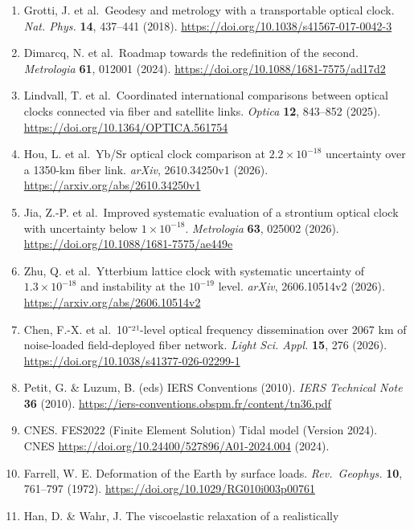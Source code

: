 \documentclass[
  10pt,
  a4paper,
]{article}
\begin{document}
\begin{enumerate}
  McGrew, W. F. et al.~Atomic clock performance enabling geodesy below
  the centimetre level. \emph{Nature} \textbf{564}, 87--90 (2018).
  \url{https://doi.org/10.1038/s41586-018-0738-2}
\item
  Grotti, J. et al.~Geodesy and metrology with a transportable optical
  clock. \emph{Nat. Phys.} \textbf{14}, 437--441 (2018).
  \url{https://doi.org/10.1038/s41567-017-0042-3}
\item
  Dimarcq, N. et al.~Roadmap towards the redefinition of the second.
  \emph{Metrologia} \textbf{61}, 012001 (2024).
  \url{https://doi.org/10.1088/1681-7575/ad17d2}
\item
  Lindvall, T. et al.~Coordinated international comparisons between
  optical clocks connected via fiber and satellite links. \emph{Optica}
  \textbf{12}, 843--852 (2025).
  \url{https://doi.org/10.1364/OPTICA.561754}
\item
  Hou, L. et al.~Yb/Sr optical clock comparison at \(2.2\times10^{-18}\)
  uncertainty over a 1350-km fiber link. \emph{arXiv}, 2610.34250v1
  (2026). \url{https://arxiv.org/abs/2610.34250v1}
\item
  Jia, Z.-P. et al.~Improved systematic evaluation of a strontium
  optical clock with uncertainty below \(1\times10^{-18}\).
  \emph{Metrologia} \textbf{63}, 025002 (2026).
  \url{https://doi.org/10.1088/1681-7575/ae449e}
\item
  Zhu, Q. et al.~Ytterbium lattice clock with systematic uncertainty of
  \(1.3\times 10^{-18}\) and instability at the \(10^{-19}\) level.
  \emph{arXiv}, 2606.10514v2 (2026).
  \url{https://arxiv.org/abs/2606.10514v2}
\item
  Chen, F.-X. et al.~10⁻²¹-level optical frequency dissemination over
  2067 km of noise-loaded field-deployed fiber network. \emph{Light Sci.
  Appl.} \textbf{15}, 276 (2026).
  \url{https://doi.org/10.1038/s41377-026-02299-1}
\item
  Petit, G. \& Luzum, B. (eds) IERS Conventions (2010). \emph{IERS
  Technical Note} \textbf{36} (2010).
  \url{https://iers-conventions.obspm.fr/content/tn36.pdf}
\item
  CNES. FES2022 (Finite Element Solution) Tidal model (Version 2024).
  CNES \url{https://doi.org/10.24400/527896/A01-2024.004} (2024).
\item
  Farrell, W. E. Deformation of the Earth by surface loads.
  \emph{Rev.~Geophys.} \textbf{10}, 761--797 (1972).
  \url{https://doi.org/10.1029/RG010i003p00761}
\item
  Han, D. \& Wahr, J. The viscoelastic relaxation of a realistically

\end{enumerate}
\end{document}

